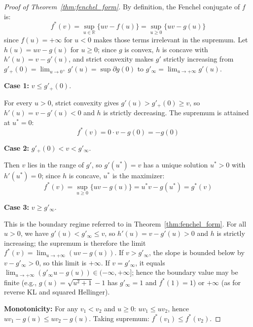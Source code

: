 \begin{proof}[Proof of Theorem~\ref{thm:fenchel_form}]
By definition, the Fenchel conjugate of $f$ is:
\begin{equation*}
f^*(v) = \sup_{u \in \mathbb{R}} \{uv - f(u)\} = \sup_{u \geq 0} \{uv - g(u)\}
\end{equation*}
since $f(u) = +\infty$ for $u < 0$ makes those terms irrelevant in the supremum.
Let $h(u) = uv - g(u)$ for $u \geq 0$; since $g$ is convex, $h$ is concave with $h'(u) = v - g'(u)$, and strict convexity makes $g'$ strictly increasing from $g'_+(0) = \lim_{u \to 0^+} g'(u) = \sup \partial g(0)$ to $g'_\infty = \lim_{u \to +\infty} g'(u)$.

\textbf{Case 1:} $v \leq g'_+(0)$.

For every $u > 0$, strict convexity gives $g'(u) > g'_+(0) \geq v$, so $h'(u) = v - g'(u) < 0$ and $h$ is strictly decreasing. The supremum is attained at $u^* = 0$:
\begin{equation*}
f^*(v) = 0 \cdot v - g(0) = -g(0)
\end{equation*}

\textbf{Case 2:} $g'_+(0) < v < g'_\infty$.

Then $v$ lies in the range of $g'$, so $g'(u^*) = v$ has a unique solution $u^* > 0$ with $h'(u^*) = 0$; since $h$ is concave, $u^*$ is the maximizer:
\begin{equation*}
f^*(v) = \sup_{u \geq 0} \{uv - g(u)\} = u^* v - g(u^*) = g^*(v)
\end{equation*}

\textbf{Case 3:} $v \geq g'_\infty$.

This is the boundary regime referred to in Theorem~\ref{thm:fenchel_form}. For all $u > 0$, we have $g'(u) < g'_\infty \leq v$, so $h'(u) = v - g'(u) > 0$ and $h$ is strictly increasing; the supremum is therefore the limit $f^*(v) = \lim_{u \to +\infty}(uv - g(u))$. If $v > g'_\infty$, the slope is bounded below by $v - g'_\infty > 0$, so this limit is $+\infty$. If $v = g'_\infty$, it equals $\lim_{u \to +\infty}(g'_\infty u - g(u)) \in (-\infty, +\infty]$; hence the boundary value may be finite (e.g., $g(u) = \sqrt{u^2+1} - 1$ has $g'_\infty = 1$ and $f^*(1) = 1$) or $+\infty$ (as for reverse KL and squared Hellinger).

\textbf{Monotonicity:} For any $v_1 < v_2$ and $u \geq 0$: $uv_1 \leq uv_2$, hence $uv_1 - g(u) \leq uv_2 - g(u)$. Taking supremum: $f^*(v_1) \leq f^*(v_2)$.
\end{proof}


